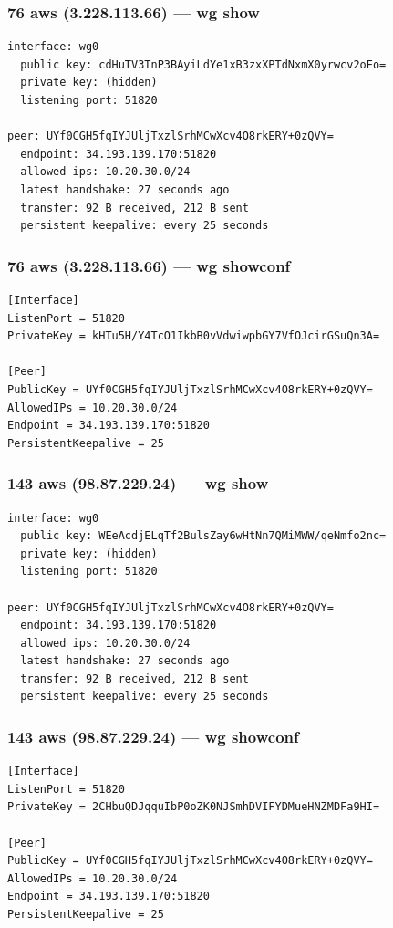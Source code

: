 \documentclass[11pt,a4paper]{article}
\begin{document}
\subsubsection*{76 aws (3.228.113.66) — wg show}
\begin{lstlisting}
interface: wg0
  public key: cdHuTV3TnP3BAyiLdYe1xB3zxXPTdNxmX0yrwcv2oEo=
  private key: (hidden)
  listening port: 51820

peer: UYf0CGH5fqIYJUljTxzlSrhMCwXcv4O8rkERY+0zQVY=
  endpoint: 34.193.139.170:51820
  allowed ips: 10.20.30.0/24
  latest handshake: 27 seconds ago
  transfer: 92 B received, 212 B sent
  persistent keepalive: every 25 seconds

\end{lstlisting}

\subsubsection*{76 aws (3.228.113.66) — wg showconf}
\begin{lstlisting}
[Interface]
ListenPort = 51820
PrivateKey = kHTu5H/Y4TcO1IkbB0vVdwiwpbGY7VfOJcirGSuQn3A=

[Peer]
PublicKey = UYf0CGH5fqIYJUljTxzlSrhMCwXcv4O8rkERY+0zQVY=
AllowedIPs = 10.20.30.0/24
Endpoint = 34.193.139.170:51820
PersistentKeepalive = 25

\end{lstlisting}

\subsubsection*{143 aws (98.87.229.24) — wg show}
\begin{lstlisting}
interface: wg0
  public key: WEeAcdjELqTf2BulsZay6wHtNn7QMiMWW/qeNmfo2nc=
  private key: (hidden)
  listening port: 51820

peer: UYf0CGH5fqIYJUljTxzlSrhMCwXcv4O8rkERY+0zQVY=
  endpoint: 34.193.139.170:51820
  allowed ips: 10.20.30.0/24
  latest handshake: 27 seconds ago
  transfer: 92 B received, 212 B sent
  persistent keepalive: every 25 seconds

\end{lstlisting}

\subsubsection*{143 aws (98.87.229.24) — wg showconf}
\begin{lstlisting}
[Interface]
ListenPort = 51820
PrivateKey = 2CHbuQDJqquIbP0oZK0NJSmhDVIFYDMueHNZMDFa9HI=

[Peer]
PublicKey = UYf0CGH5fqIYJUljTxzlSrhMCwXcv4O8rkERY+0zQVY=
AllowedIPs = 10.20.30.0/24
Endpoint = 34.193.139.170:51820
PersistentKeepalive = 25

\end{lstlisting}
\end{document}
